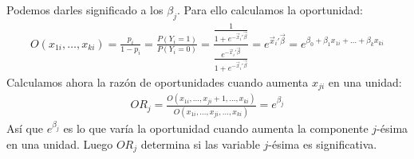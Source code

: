 Podemos darles significado a los $\beta_j$. Para ello calculamos la oportunidad:
\begin{align*}
    O(x_{1i}, \dots, x_{ki}) = \frac{p_i}{1-p_i} = \frac{P(Y_i = 1)}{P(Y_i = 0)} = \dfrac{\frac{1}{1+e^{-\vec{x}_i'\vec{\beta}}}}{\frac{e^{-\vec{x}_i'\vec{\beta}}}{1+e^{-\vec{x}_i'\vec{\beta}}}} = e^{\vec{x}_i'\vec{\beta}} = e^{\beta_0 + \beta_1x_{1i} + \dots + \beta_kx_{ki}}
\end{align*}
Calculamos ahora la razón de oportunidades cuando aumenta $x_{ji}$ en una unidad:
\begin{align*}
    OR_j = \frac{O(x_{1i}, \dots, x_{ji}+1, \dots, x_{ki})}{O(x_{1i}, \dots, x_{ji}, \dots, x_{ki})} = e^{\beta_j}
\end{align*}
Así que $e^{\beta_j}$ es lo que varía la oportunidad cuando aumenta la componente $j$-ésima en una unidad. Luego $OR_j$ determina si las variable $j$-ésima es significativa.